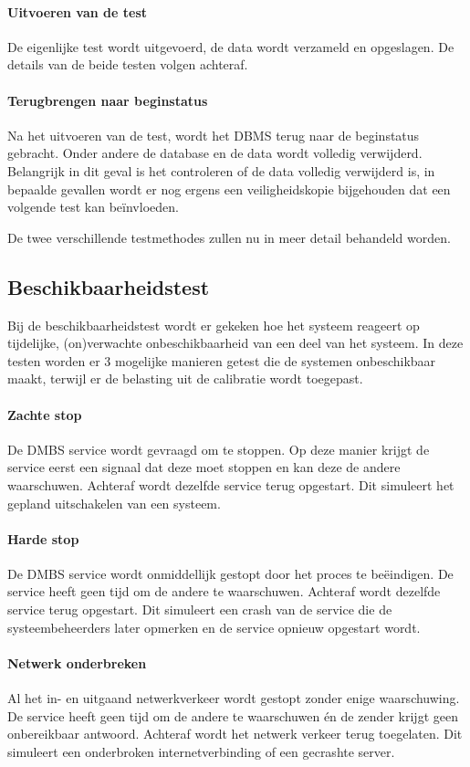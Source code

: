 \paragraph{Uitvoeren van de test} De eigenlijke test wordt uitgevoerd, de data wordt verzameld en opgeslagen. De details van de beide testen volgen achteraf. 

\paragraph{Terugbrengen naar beginstatus} Na het uitvoeren van de test, wordt het DBMS terug naar de beginstatus gebracht. Onder andere de database en de data wordt volledig verwijderd. Belangrijk in dit geval is het controleren of de data volledig verwijderd is, in bepaalde gevallen wordt er nog ergens een veiligheidskopie bijgehouden dat een volgende test kan beïnvloeden. 

De twee verschillende testmethodes zullen nu in meer detail behandeld worden. 
\subsection{Beschikbaarheidstest}
Bij de beschikbaarheidstest wordt er gekeken hoe het systeem reageert op tijdelijke, (on)verwachte onbeschikbaarheid van een deel van het systeem. In deze testen worden er 3 mogelijke manieren getest die de systemen onbeschikbaar maakt, terwijl er de belasting uit de calibratie wordt toegepast. 

\paragraph{Zachte stop} De DMBS service wordt gevraagd om te stoppen. Op deze manier krijgt de service eerst een signaal dat deze moet stoppen en kan deze de andere waarschuwen. Achteraf wordt dezelfde service terug opgestart. Dit simuleert het gepland uitschakelen van een systeem. 

\paragraph{Harde stop} De DMBS service wordt onmiddellijk gestopt door het proces te beëindigen. De service heeft geen tijd om de andere te waarschuwen. Achteraf wordt dezelfde service terug opgestart. Dit simuleert een crash van de service die de systeembeheerders later opmerken en de service opnieuw opgestart wordt. 

\paragraph{Netwerk onderbreken} Al het in- en uitgaand netwerkverkeer wordt gestopt zonder enige waarschuwing. De service heeft geen tijd om de andere te waarschuwen én de zender krijgt geen onbereikbaar antwoord. Achteraf wordt het netwerk verkeer terug toegelaten. Dit simuleert een onderbroken internetverbinding of een gecrashte server.  


